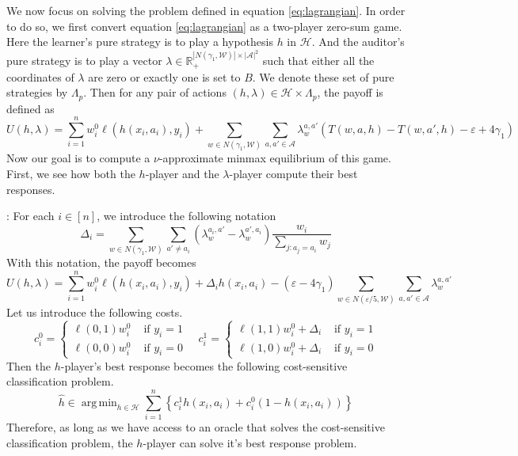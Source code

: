 \documentclass{article}
\renewcommand{\hat}{\widehat}
\newcommand{\bbR}{\mathbb{R}}
\DeclareMathOperator*{\argmin}{arg\,min}
\newcommand{\WW}{\mathcal{W}}
\newcommand{\abs}[1]{\left|#1\right|}
\newcommand{\Ac}{\mathcal{A}}
\newcommand{\HH}{\mathcal{H}}
\newcommand{\eps}{\varepsilon}
\begin{document}
We now focus on solving the problem defined in equation \ref{eq:lagrangian}. In order to do so, we first convert equation \ref{eq:lagrangian} as a two-player zero-sum game. Here the learner's pure strategy is to play a hypothesis $h$ in $\HH$. And the auditor's pure strategy is to play a vector $\lambda \in \bbR_+^{\abs{N(\gamma_1,\WW)} \times \abs{\Ac}^2}$ such that either all the coordinates of $\lambda$ are zero or exactly one is set to $B$. We denote these set of pure strategies by $\Lambda_p$. Then for any pair of actions $(h,\lambda) \in \HH \times \Lambda_p$, the payoff is defined as
\[U(h,\lambda) = \sum_{i=1}^n w^0_i \ell(h(x_i,a_i),y_i) + \sum_{w \in N(\gamma_1,\WW)} \sum_{a,a' \in \Ac} \lambda_w^{a,a'} ( T(w,a,h) - T(w,a',h) - \eps + 4\gamma_1) \]
Now our goal is to compute a $\nu$-approximate minmax equilibrium of this game. First, we see how both the $h$-player and the $\lambda$-player compute their best responses. 

: For each $i \in [n]$, we introduce the following notation
$$\Delta_i = \sum_{w \in N(\gamma_1,\WW)} \sum_{a' \neq a_i} \left(\lambda^{a_i,a'}_w - \lambda^{a',a_i}_w \right) \frac{w_i}{\sum_{j:a_j = a_i}w_j}$$
With this notation, the payoff becomes
$$U(h,\lambda) = \sum_{i=1}^n w^0_i \ell(h(x_i,a_i),y_i) + \Delta_i h(x_i,a_i) - (\eps - 4\gamma_1)\sum_{w \in N(\eps/5,\WW)} \sum_{a,a' \in \Ac} \lambda_w^{a,a'}$$
Let us introduce the following costs.
\begin{equation}
c^0_i = \left\{ \begin{array}{cc}
\ell(0,1)w^0_i & \text{ if } y_i = 1\\
\ell(0,0)w^0_i & \text{ if } y_i = 0
\end{array}\right. \quad 
c^1_i = \left\{ \begin{array}{cc}
\ell(1,1)w^0_i + \Delta_i & \text{ if } y_i = 1\\
\ell(1,0)w^0_i + \Delta_i & \text{ if } y_i = 0
\end{array}\right.
\end{equation}
Then the $h$-player's best response becomes the following cost-sensitive classification problem.
\begin{equation}
\hat{h} \in \argmin_{h \in \HH} \sum_{i=1}^n \left\{c^1_i h(x_i,a_i) + c^0_i (1 - h(x_i,a_i)) \right\}
\end{equation}
Therefore, as long as we have access to an oracle that solves the cost-sensitive classification problem, the $h$-player can solve it's best response problem.
\end{document}
